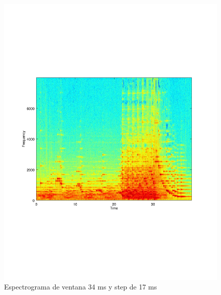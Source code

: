 \documentclass[paper=a4, fontsize=11pt]{scrartcl} %
\numberwithin{equation}{section} %
\numberwithin{figure}{section} %
\numberwithin{table}{section} %
\begin{document}
\begin{figure}[th!]
\includegraphics[width=\textwidth]{../images/specgram_w34s17.pdf}
\caption{Espectrograma de ventana 34 ms y step de 17 ms}
\label{s_34_17}
\end{figure}
\end{document}
